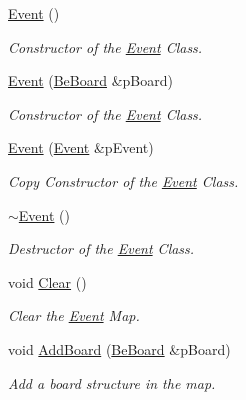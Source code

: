 \begin{DoxyCompactItemize}
\item 
\hyperlink{class_ph2___hw_interface_1_1_event_a61150c0e6dad5ec2068c126e8a018fe1}{Event} ()
\begin{DoxyCompactList}\small\item\em Constructor of the \hyperlink{class_ph2___hw_interface_1_1_event}{Event} Class. \end{DoxyCompactList}\item 
\hyperlink{class_ph2___hw_interface_1_1_event_ae6873ebe9fd64b7d039098e97d815106}{Event} (\hyperlink{class_ph2___hw_description_1_1_be_board}{Be\-Board} \&p\-Board)
\begin{DoxyCompactList}\small\item\em Constructor of the \hyperlink{class_ph2___hw_interface_1_1_event}{Event} Class. \end{DoxyCompactList}\item 
\hyperlink{class_ph2___hw_interface_1_1_event_a3f676bea23859e6417f1ccbade7308df}{Event} (\hyperlink{class_ph2___hw_interface_1_1_event}{Event} \&p\-Event)
\begin{DoxyCompactList}\small\item\em Copy Constructor of the \hyperlink{class_ph2___hw_interface_1_1_event}{Event} Class. \end{DoxyCompactList}\item 
\hyperlink{class_ph2___hw_interface_1_1_event_a2698d395adfcd65d0853676a899127fc}{$\sim$\-Event} ()
\begin{DoxyCompactList}\small\item\em Destructor of the \hyperlink{class_ph2___hw_interface_1_1_event}{Event} Class. \end{DoxyCompactList}\item 
void \hyperlink{class_ph2___hw_interface_1_1_event_ac324585a7a75fb07c51e71317e53ea64}{Clear} ()
\begin{DoxyCompactList}\small\item\em Clear the \hyperlink{class_ph2___hw_interface_1_1_event}{Event} Map. \end{DoxyCompactList}\item 
void \hyperlink{class_ph2___hw_interface_1_1_event_a41a2aae19c78d908c738163e56f1be0b}{Add\-Board} (\hyperlink{class_ph2___hw_description_1_1_be_board}{Be\-Board} \&p\-Board)
\begin{DoxyCompactList}\small\item\em Add a board structure in the map. \end{DoxyCompactList}\item 

\end{DoxyCompactItemize}
